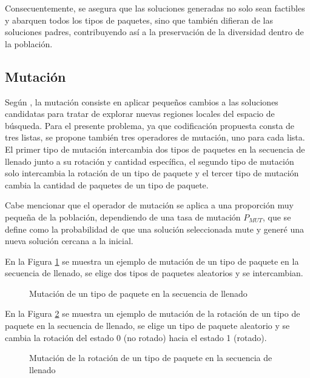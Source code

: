 Consecuentemente, se asegura que las soluciones generadas no solo sean factibles y abarquen todos los tipos de paquetes, sino que también difieran de las soluciones padres, contribuyendo así a la preservación de la diversidad dentro de la población.

\subsection{Mutación}

Según \textcite{Dockhorn2022}, la mutación consiste en aplicar pequeños cambios a las soluciones candidatas para tratar de explorar nuevas regiones locales del espacio de búsqueda. Para el presente problema, ya que codificación propuesta consta de tres listas, se propone también tres operadores de mutación, uno para cada lista. El primer tipo de mutación intercambia dos tipos de paquetes en la secuencia de llenado junto a su rotación y cantidad específica, el segundo tipo de mutación solo intercambia la rotación de un tipo de paquete y el tercer tipo de mutación cambia la cantidad de paquetes de un tipo de paquete.

Cabe mencionar que el operador de mutación se aplica a una proporción muy pequeña de la población, dependiendo de una tasa de mutación $P_{MUT}$, que se define como la probabilidad de que una solución seleccionada mute y generé una nueva solución cercana a la inicial.

En la Figura \ref{fig:mutacion_tipo} se muestra un ejemplo de mutación de un tipo de paquete en la secuencia de llenado, se elige dos tipos de paquetes aleatorios y se intercambian.

\begin{figure}[H]
    \centering
    
    \caption{Mutación de un tipo de paquete en la secuencia de llenado}
    \label{fig:mutacion_tipo}
\end{figure}

En la Figura \ref{fig:mutacion_rotacion} se muestra un ejemplo de mutación de la rotación de un tipo de paquete en la secuencia de llenado, se elige un tipo de paquete aleatorio y se cambia la rotación del estado 0 (no rotado) hacia el estado 1 (rotado).

\begin{figure}[H]
    \centering
    
    \caption{Mutación de la rotación de un tipo de paquete en la secuencia de llenado}
    \label{fig:mutacion_rotacion}
\end{figure}

